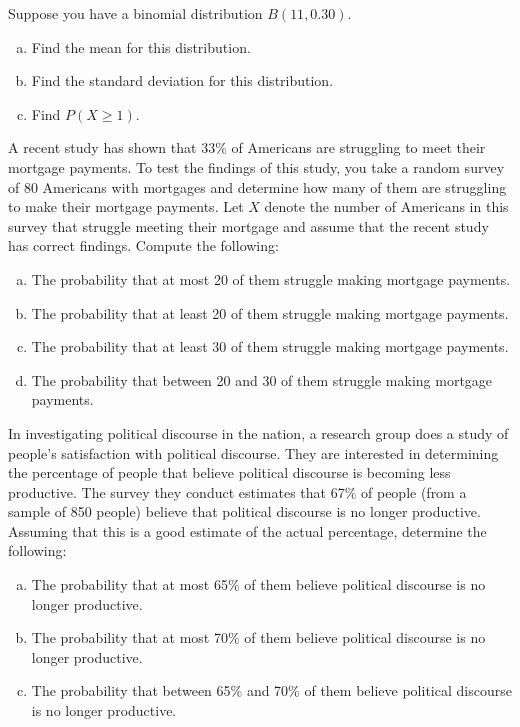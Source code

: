 \documentclass[11pt,letterpaper]{article}
\begin{document}

 Suppose you have a binomial distribution $B(11, 0.30)$. 
	\begin{enumerate}[(a)]
	\item Find the mean for this distribution. 
	\item Find the standard deviation for this distribution. 
	\item Find $P(X \geq 1)$. 
	\end{enumerate}



\newpage



 A recent study has shown that 33\% of Americans are struggling to meet their mortgage payments. To test the findings of this study, you take a random survey of 80 Americans with mortgages and determine how many of them are struggling to make their mortgage payments. Let $X$ denote the number of Americans in this survey that struggle meeting their mortgage and assume that the recent study has correct findings. Compute the following:
	\begin{enumerate}[(a)]
	\item The probability that at most 20 of them struggle making mortgage payments. 
	\item The probability that at least 20 of them struggle making mortgage payments. 
	\item The probability that at least 30 of them struggle making mortgage payments. 
	\item The probability that between 20 and 30 of them struggle making mortgage payments. 
	\end{enumerate}



\newpage



 In investigating political discourse in the nation, a research group does a study of people's satisfaction with political discourse. They are interested in determining the percentage of people that believe political discourse is becoming less productive. The survey they conduct estimates that 67\% of people (from a sample of 850 people) believe that political discourse is no longer productive. Assuming that this is a good estimate of the actual percentage, determine the following:
	\begin{enumerate}[(a)]
	\item The probability that at most 65\% of them believe political discourse is no longer productive. 
	\item The probability that at most 70\% of them believe political discourse is no longer productive. 
	\item The probability that between 65\% and 70\% of them believe political discourse is no longer productive. 
	\end{enumerate}
\end{document}
